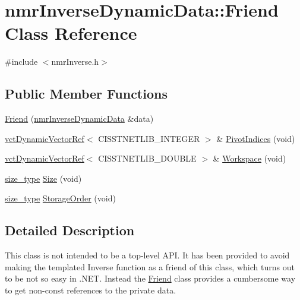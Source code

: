 \hypertarget{classnmr_inverse_dynamic_data_1_1_friend}{}\section{nmr\+Inverse\+Dynamic\+Data\+:\+:Friend Class Reference}
\label{classnmr_inverse_dynamic_data_1_1_friend}


{\ttfamily \#include $<$nmr\+Inverse.\+h$>$}

\subsection*{Public Member Functions}
\begin{DoxyCompactItemize}
\item 
\hyperlink{classnmr_inverse_dynamic_data_1_1_friend_a6e70a4de7c804e9e22c54a46c8ee93d4}{Friend} (\hyperlink{classnmr_inverse_dynamic_data}{nmr\+Inverse\+Dynamic\+Data} \&data)
\item 
\hyperlink{classvct_dynamic_vector_ref}{vct\+Dynamic\+Vector\+Ref}$<$ C\+I\+S\+S\+T\+N\+E\+T\+L\+I\+B\+\_\+\+I\+N\+T\+E\+G\+E\+R $>$ \& \hyperlink{classnmr_inverse_dynamic_data_1_1_friend_ad708058883a5ab865da310e1e5ae6b94}{Pivot\+Indices} (void)
\item 
\hyperlink{classvct_dynamic_vector_ref}{vct\+Dynamic\+Vector\+Ref}$<$ C\+I\+S\+S\+T\+N\+E\+T\+L\+I\+B\+\_\+\+D\+O\+U\+B\+L\+E $>$ \& \hyperlink{classnmr_inverse_dynamic_data_1_1_friend_ae343911867b411f141de3648bac1ebcb}{Workspace} (void)
\item 
\hyperlink{classnmr_inverse_dynamic_data_aeb5c2317adf50d8fc7952a9b38bf0129}{size\+\_\+type} \hyperlink{classnmr_inverse_dynamic_data_1_1_friend_ac6c64427fe6f2cf5a335690f318e8550}{Size} (void)
\item 
\hyperlink{classnmr_inverse_dynamic_data_aeb5c2317adf50d8fc7952a9b38bf0129}{size\+\_\+type} \hyperlink{classnmr_inverse_dynamic_data_1_1_friend_aa67627baa779a23dd5190be9cabb3308}{Storage\+Order} (void)
\end{DoxyCompactItemize}


\subsection{Detailed Description}
This class is not intended to be a top-\/level A\+P\+I. It has been provided to avoid making the templated Inverse function as a friend of this class, which turns out to be not so easy in .N\+E\+T. Instead the \hyperlink{classnmr_inverse_dynamic_data_1_1_friend}{Friend} class provides a cumbersome way to get non-\/const references to the private data. 

